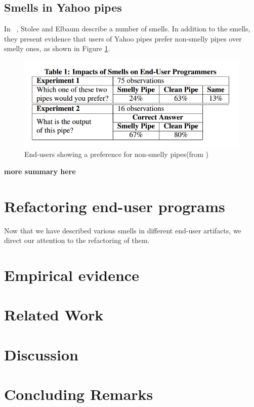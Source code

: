 \documentclass[10pt,conference,compsocconf]{IEEEtran}
\newcommand{\todo}[1]{\textbf{#1}}
\begin{document}
\subsection{Smells in Yahoo pipes}
In ~\cite{Stolee2011}, Stolee and Elbaum describe a number of smells. In addition to the smells, they present evidence that users of Yahoo pipes prefer non-smelly pipes over smelly ones, as shown in Figure \ref{fig:Table1-Stolee2011}.

\begin{figure}[ht!]
\centering
\includegraphics[width=\columnwidth]{Table1-Stolee2011.png}
\caption{End-users showing a preference for non-smelly pipes(from \cite{Stolee2011})}
\label{fig:Table1-Stolee2011}
\end{figure}

\todo{more summary here}

\section{Refactoring end-user programs}
\label{sec:refactoring}
Now that we have described various smells in different end-user artifacts, we direct our attention to the refactoring of them. 

\section{Empirical evidence}
\label{sec:empirical}


\section{Related Work}
\label{sec:related_work}

\section{Discussion}
\label{sec:discussion}


\section{Concluding Remarks}
\label{sec:conclusions}

\newpage
\balance


\end{document}
